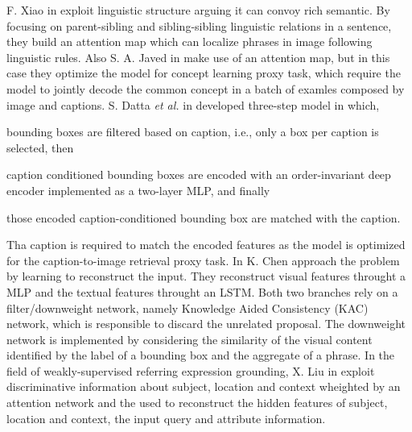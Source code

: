 
F. Xiao \etal{} in  exploit linguistic structure arguing it can convoy rich
semantic. By focusing on parent-sibling and sibling-sibling linguistic
relations in a sentence, they build an attention map which can
localize phrases in image following linguistic rules. Also S. A. Javed
\etal{} in  make use of an attention map, but in this
case they optimize the model for concept learning proxy task, which
require the model to jointly decode the common concept in a batch of
examles composed by image and captions. S. Datta \textit{et al.} in
 developed three-step model in which, 
\begin{enumerate*}[label=(\roman*)] 
    \item bounding boxes are filtered based on caption, i.e., only a
    box per caption is selected, then
    \item caption conditioned bounding boxes are encoded with an
    order-invariant deep encoder implemented as a two-layer MLP, and
    finally
    \item those encoded caption-conditioned bounding box are matched
with the caption.
\end{enumerate*}
Tha caption is required to match the encoded features as the model is
optimized for the caption-to-image retrieval proxy task. In  K.
Chen \etal{} approach the problem by learning to reconstruct the
input. They reconstruct visual features throught a MLP and the textual
features throught an LSTM. Both two branches rely on a
filter/downweight network, namely Knowledge Aided Consistency (KAC)
network, which is responsible to discard the unrelated proposal. The
downweight network is implemented by considering the similarity of the
visual content identified by the label of a bounding box and the
aggregate of a phrase. In the field of weakly-supervised referring
expression grounding, X. Liu \etal{} in 
exploit discriminative information about subject, location and context
wheighted by an attention network and the used to reconstruct the
hidden features of subject, location and context, the input query and
attribute information.

